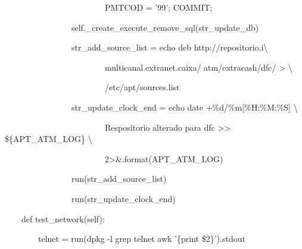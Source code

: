 {\ttfamily\color[rgb]{0.10980392,0.10980392,0.10980392}
    \ \ \ \ \ \ \ \ \ \ \ \ \ \ \ \ \ \ \ \ \ \ \ \ PMTCOD = '99'; COMMIT;{\textquotedbl}}

{\ttfamily\color[rgb]{0.10980392,0.10980392,0.10980392}
    \ \ \ \ \ \ \ \ \ \ \ \ \ \ \ \ self.\_create\_execute\_remove\_sql(str\_update\_db)}

{\ttfamily\color[rgb]{0.10980392,0.10980392,0.10980392}
    \ \ \ \ \ \ \ \ \ \ \ \ \ \ \ \ str\_add\_source\_list = {\textquotedbl}{\textquotedbl}{\textquotedbl}echo
    {\textquotedbl}deb http://repositorio.i{\textbackslash}}

{\ttfamily\color[rgb]{0.10980392,0.10980392,0.10980392}
    \ \ \ \ \ \ \ \ \ \ \ \ \ \ \ \ \ \ \ \ \ \ \ \ multicanal.extranet.caixa/ atm/extracash/dfc/{\textquotedbl}
    {\textgreater} {\textbackslash}}

{\ttfamily\color[rgb]{0.10980392,0.10980392,0.10980392}
    \ \ \ \ \ \ \ \ \ \ \ \ \ \ \ \ \ \ \ \ \ \ \ \ /etc/apt/sources.list{\textquotedbl}
    {\textquotedbl}{\textquotedbl}{\textquotedbl}}

{\ttfamily\color[rgb]{0.10980392,0.10980392,0.10980392}
    \ \ \ \ \ \ \ \ \ \ \ \ \ \ \ \ str\_update\_clock\_end = {\textquotedbl}{\textquotedbl}{\textquotedbl}echo
    {\textquotedbl}{\textasciigrave}date +\%d/\%m[\%H:\%M:\%S]{\textasciigrave} {\textbackslash}}

{\ttfamily\color[rgb]{0.10980392,0.10980392,0.10980392}
    \ \ \ \ \ \ \ \ \ \ \ \ \ \ \ \ \ \ \ \ \ \ \ \ Respositorio alterado para dfc{\textquotedbl}
    {\textgreater}{\textgreater} \$\{APT\_ATM\_LOG\} {\textbackslash}}

{\ttfamily\color[rgb]{0.10980392,0.10980392,0.10980392}
    \ \ \ \ \ \ \ \ \ \ \ \ \ \ \ \ \ \ \ \ \ \ \ \ 2{\textgreater}\&{\textquotedbl}{\textquotedbl}{\textquotedbl}.format(APT\_ATM\_LOG)}


    \bigskip

{\ttfamily\color[rgb]{0.10980392,0.10980392,0.10980392}
    \ \ \ \ \ \ \ \ \ \ \ \ \ \ \ \ run(str\_add\_source\_list)}

{\ttfamily\color[rgb]{0.10980392,0.10980392,0.10980392}
    \ \ \ \ \ \ \ \ \ \ \ \ \ \ \ \ run(str\_update\_clock\_end)}


    \bigskip

{\ttfamily\color[rgb]{0.10980392,0.10980392,0.10980392}
    \ \ \ \ def test\_network(self):}

{\ttfamily\color[rgb]{0.10980392,0.10980392,0.10980392}
    \ \ \ \ \ \ \ \ telnet = run({\textquotedbl}dpkg -l {\textbar}grep telnet {\textbar}awk '\{print
            \$2\}'{\textquotedbl}).stdout}

